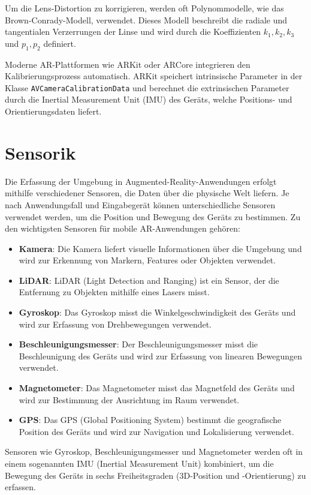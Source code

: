 Um die Lens-Distortion zu korrigieren, werden oft Polynommodelle, wie das Brown-Conrady-Modell, verwendet. Dieses Modell beschreibt die radiale und tangentialen Verzerrungen der Linse und wird durch die Koeffizienten \( k_1, k_2, k_3 \) und \( p_1, p_2 \) definiert.

Moderne AR-Plattformen wie ARKit oder ARCore integrieren den Kalibrierungsprozess automatisch. ARKit speichert intrinsische Parameter in der Klasse \texttt{AVCameraCalibrationData} und berechnet die extrinsischen Parameter durch die Inertial Measurement Unit (IMU) des Geräts, welche Positions- und Orientierungsdaten liefert.

\section{Sensorik}

Die Erfassung der Umgebung in Augmented-Reality-Anwendungen erfolgt mithilfe verschiedener Sensoren, die Daten über die physische Welt liefern. Je nach Anwendungsfall und Eingabegerät können unterschiedliche Sensoren verwendet werden, um die Position und Bewegung des Geräts zu bestimmen. Zu den wichtigsten Sensoren für mobile AR-Anwendungen gehören:

\begin{itemize}
    \item \textbf{Kamera}: Die Kamera liefert visuelle Informationen über die Umgebung und wird zur Erkennung von Markern, Features oder Objekten verwendet.
    \item \textbf{LiDAR}: LiDAR (Light Detection and Ranging) ist ein Sensor, der die Entfernung zu Objekten mithilfe eines Lasers misst.
    \item \textbf{Gyroskop}: Das Gyroskop misst die Winkelgeschwindigkeit des Geräts und wird zur Erfassung von Drehbewegungen verwendet.
    \item \textbf{Beschleunigungsmesser}: Der Beschleunigungsmesser misst die Beschleunigung des Geräts und wird zur Erfassung von linearen Bewegungen verwendet.
    \item \textbf{Magnetometer}: Das Magnetometer misst das Magnetfeld des Geräts und wird zur Bestimmung der Ausrichtung im Raum verwendet.
    \item \textbf{GPS}: Das GPS (Global Positioning System) bestimmt die geografische Position des Geräts und wird zur Navigation und Lokalisierung verwendet.
\end{itemize}

Sensoren wie Gyroskop, Beschleunigungsmesser und Magnetometer werden oft in einem sogenannten IMU (Inertial Measurement Unit) kombiniert, um die Bewegung des Geräts in sechs Freiheitsgraden (3D-Position und -Orientierung) zu erfassen. 

